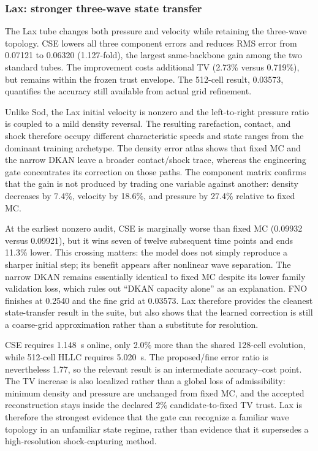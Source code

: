 \documentclass[10pt,twocolumn]{article}
\begin{document}
\subsubsection{Lax: stronger three-wave state transfer}

The Lax tube changes both pressure and velocity while retaining the three-wave topology. CSE lowers all three component errors and reduces RMS error from 0.07121 to 0.06320 (1.127-fold), the largest same-backbone gain among the two standard tubes. The improvement costs additional TV (2.73\% versus 0.719\%), but remains within the frozen trust envelope. The 512-cell result, 0.03573, quantifies the accuracy still available from actual grid refinement.

Unlike Sod, the Lax initial velocity is nonzero and the left-to-right pressure ratio is coupled to a mild density reversal. The resulting rarefaction, contact, and shock therefore occupy different characteristic speeds and state ranges from the dominant training archetype. The density error atlas shows that fixed MC and the narrow DKAN leave a broader contact/shock trace, whereas the engineering gate concentrates its correction on those paths. The component matrix confirms that the gain is not produced by trading one variable against another: density decreases by 7.4\%, velocity by 18.6\%, and pressure by 27.4\% relative to fixed MC.

At the earliest nonzero audit, CSE is marginally worse than fixed MC (0.09932 versus 0.09921), but it wins seven of twelve subsequent time points and ends 11.3\% lower. This crossing matters: the model does not simply reproduce a sharper initial step; its benefit appears after nonlinear wave separation. The narrow DKAN remains essentially identical to fixed MC despite its lower family validation loss, which rules out ``DKAN capacity alone'' as an explanation. FNO finishes at 0.2540 and the fine grid at 0.03573. Lax therefore provides the cleanest state-transfer result in the suite, but also shows that the learned correction is still a coarse-grid approximation rather than a substitute for resolution.

CSE requires 1.148~s online, only 2.0\% more than the shared 128-cell evolution, while 512-cell HLLC requires 5.020~s. The proposed/fine error ratio is nevertheless 1.77, so the relevant result is an intermediate accuracy--cost point. The TV increase is also localized rather than a global loss of admissibility: minimum density and pressure are unchanged from fixed MC, and the accepted reconstruction stays inside the declared 2\% candidate-to-fixed TV trust. Lax is therefore the strongest evidence that the gate can recognize a familiar wave topology in an unfamiliar state regime, rather than evidence that it supersedes a high-resolution shock-capturing method.
\end{document}
